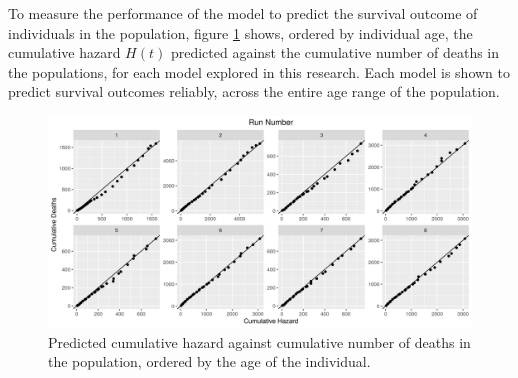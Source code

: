 \documentclass[
]{article}
\begin{document}
To measure the performance of the model to predict the survival outcome of individuals in the population, figure \ref{fig:cumpred} shows, ordered by individual age, the cumulative hazard \(H(t)\) predicted against the cumulative number of deaths in the populations, for each model explored in this research. Each model is shown to predict survival outcomes reliably, across the entire age range of the population.

\begin{figure}
\hypertarget{fig:cumpred}{%
\centering
\includegraphics{./Plots/Survival/redlinpred_Cumulative_haz-death_age.png}
\caption{Predicted cumulative hazard against cumulative number of deaths in the population, ordered by the age of the individual.}\label{fig:cumpred}
}
\end{figure}
\end{document}
